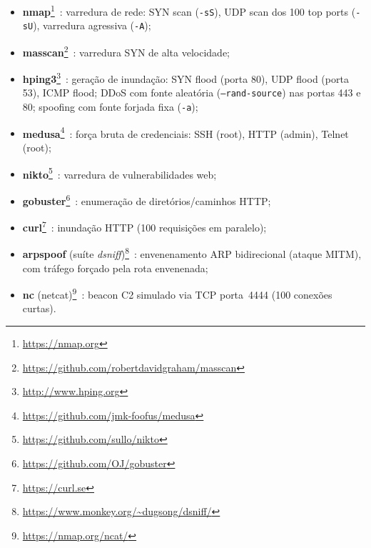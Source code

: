 \documentclass[12pt,a4paper]{article}
\begin{document}
\begin{itemize}
  \item \textbf{nmap}\footnote{\url{https://nmap.org}}~\cite{nmap}: varredura de
    rede: SYN scan (\texttt{-sS}), UDP scan dos 100 top ports (\texttt{-sU}),
    varredura agressiva (\texttt{-A});
  \item \textbf{masscan}\footnote{\url{https://github.com/robertdavidgraham/masscan}}~\cite{masscan}:
    varredura SYN de alta velocidade;
  \item \textbf{hping3}\footnote{\url{http://www.hping.org}}~\cite{hping3}:
    geração de inundação: SYN flood (porta 80), UDP flood (porta 53), ICMP flood;
    DDoS com fonte aleatória (\texttt{--rand-source}) nas portas 443 e 80;
    spoofing com fonte forjada fixa (\texttt{-a});
  \item \textbf{medusa}\footnote{\url{https://github.com/jmk-foofus/medusa}}~\cite{medusa}:
    força bruta de credenciais: SSH (root), HTTP (admin), Telnet (root);
  \item \textbf{nikto}\footnote{\url{https://github.com/sullo/nikto}}~\cite{nikto}:
    varredura de vulnerabilidades web;
  \item \textbf{gobuster}\footnote{\url{https://github.com/OJ/gobuster}}~\cite{gobuster}:
    enumeração de diretórios/caminhos HTTP;
  \item \textbf{curl}\footnote{\url{https://curl.se}}~\cite{curl}: inundação HTTP
    (100 requisições em paralelo);
  \item \textbf{arpspoof} (suíte \textit{dsniff})\footnote{\url{https://www.monkey.org/~dugsong/dsniff/}}~\cite{dsniff}:
    envenenamento ARP bidirecional (ataque MITM), com tráfego forçado pela rota
    envenenada;
  \item \textbf{nc} (netcat)\footnote{\url{https://nmap.org/ncat/}}~\cite{ncat}:
    beacon C2 simulado via TCP porta~4444 (100 conexões curtas).
\end{itemize}
\end{document}
